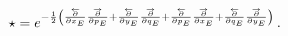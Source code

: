 \begin{equation}
\star =e^{-{\frac{1}{2}}\left( {\frac{\overleftarrow{\partial }}{\partial
x_{E}}}{\frac{\overrightarrow{\partial }}{\partial p_{E}}}+{\frac{%
\overleftarrow{\partial }}{\partial y_{E}}}{\frac{\overrightarrow{\partial }%
}{\partial q_{E}}}+{\frac{\overleftarrow{\partial }}{\partial p_{E}}}{\frac{%
\overrightarrow{\partial }}{\partial x_{E}}}+{\frac{\overleftarrow{\partial }%
}{\partial q_{E}}}{\frac{\overrightarrow{\partial }}{\partial y_{E}}}\right)
}\,.
\end{equation}

